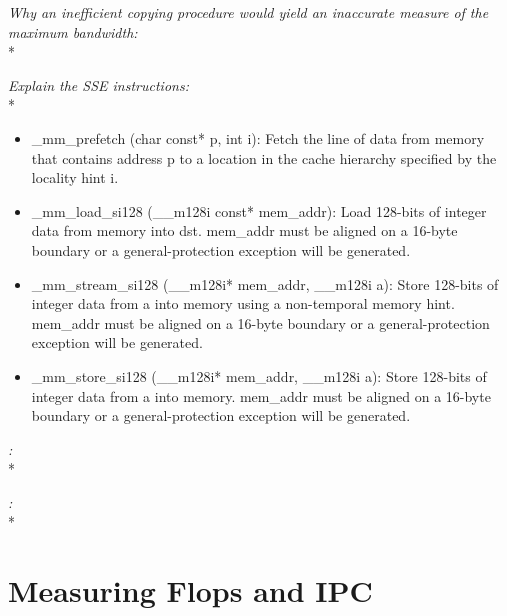 \documentclass[11pt,letter]{article}
\begin{document}
\noindent\emph{Why an inefficient  copying procedure would yield an inaccurate measure of the maximum bandwidth:}\\*


\noindent\emph{Explain the SSE instructions:}\\*
\begin{itemize}
\item \textsf{\_mm\_prefetch (char const* p, int i)}: Fetch the line of data from memory that contains address p to a location in the cache hierarchy specified by the locality hint i.
\item \textsf{\_mm\_load\_si128 (\_\_m128i const* mem\_addr)}: Load 128-bits of integer data from memory into dst. mem\_addr must be aligned on a 16-byte boundary or a general-protection exception will be generated.
\item \textsf{\_mm\_stream\_si128 (\_\_m128i* mem\_addr, \_\_m128i a)}: Store 128-bits of integer data from a into memory using a non-temporal memory hint. mem\_addr must be aligned on a 16-byte boundary or a general-protection exception will be generated.
\item \textsf{\_mm\_store\_si128 (\_\_m128i* mem\_addr, \_\_m128i a)}: Store 128-bits of integer data from a into memory. mem\_addr must be aligned on a 16-byte boundary or a general-protection exception will be generated.
\end{itemize}


\noindent\emph{:}\\*

\noindent\emph{:}\\*

\section{Measuring Flops and IPC}
\end{document}
